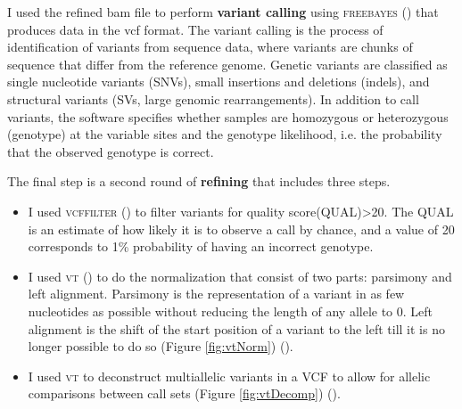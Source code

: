 \documentclass[
tikz,
11pt, %
oneside, %
english, %
singlespacing, %
headsepline, %
]{MastersDoctoralThesisV2} %
\begin{document}
I used the refined bam file to perform \textbf{variant calling} using \textsc{freebayes} (\cite{garrison2012haplotype}) that produces data in the \gls{vcf} format. The variant calling is the process of identification of variants from sequence data, where variants are chunks of sequence that differ from the reference genome. Genetic variants are classified as single nucleotide variants (SNVs), small insertions and deletions (indels), and structural variants (SVs, large genomic rearrangements). In addition to call variants, the software specifies whether samples are homozygous or heterozygous (genotype) at the variable sites and the \gls{genotype likelihood}, i.e. the probability that the observed genotype is correct. 





The final step is a second round of \textbf{refining} that includes three steps. 
\begin{itemize}
    \item I used \textsc{vcffilter} (\cite{vcflib}) to filter variants for \gls{quality score}(QUAL)>20. The QUAL is an estimate of how likely it is to observe a call by chance, and a value of 20 corresponds to 1\% probability of having an incorrect genotype.
    \item I used \textsc{vt} (\cite{tan2015unified}) to do the normalization that consist of two parts: parsimony and left alignment. Parsimony is the representation of a variant in as few nucleotides as possible without reducing the length of any allele to 0. Left alignment is the shift of the start position of a variant to the left till it is no longer possible to do so (Figure \ref{fig:vtNorm}) (\cite{tan2015unified}).
    \item I used \textsc{vt} to deconstruct multiallelic variants in a VCF to allow for allelic comparisons between call sets (Figure \ref{fig:vtDecomp}) (\cite{tan2015unified}).
\end{itemize}
\end{document}
